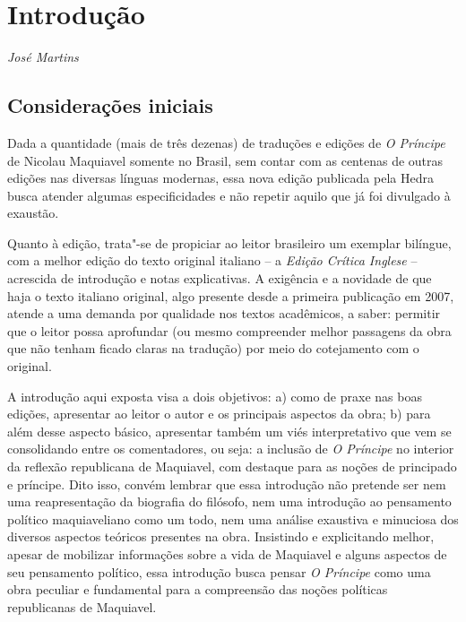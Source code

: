\chapter*{Introdução} %

\begin{flushright}
\emph{José Martins}
\end{flushright}

\section{Considerações iniciais}

Dada a quantidade (mais de três dezenas) de traduções e edições de
\emph{O Príncipe} de Nicolau Maquiavel somente no Brasil, sem contar com
as centenas de outras edições nas diversas línguas modernas, essa nova
edição publicada pela Hedra busca atender algumas especificidades e não
repetir aquilo que já foi divulgado à exaustão.

Quanto à edição, trata"-se de propiciar ao leitor brasileiro um exemplar
bilíngue, com a melhor edição do texto original italiano -- a
\emph{Edição Crítica Inglese} -- acrescida de introdução e notas
explicativas. A exigência e a novidade de que haja o texto italiano
original, algo presente desde a primeira publicação em 2007, atende a
uma demanda por qualidade nos textos acadêmicos, a saber: permitir que o
leitor possa aprofundar (ou mesmo compreender melhor passagens da obra
que não tenham ficado claras na tradução) por meio do cotejamento com o
original.

A introdução aqui exposta visa a dois objetivos: a) como de praxe nas
boas edições, apresentar ao leitor o autor e os principais aspectos da
obra; b) para além desse aspecto básico, apresentar também um viés
interpretativo que vem se consolidando entre os comentadores, ou seja: a
inclusão de \emph{O Príncipe} no interior da reflexão republicana de
Maquiavel, com destaque para as noções de principado e príncipe. Dito
isso, convém lembrar que essa introdução não pretende ser nem uma
reapresentação da biografia do filósofo, nem uma introdução ao
pensamento político maquiaveliano como um todo, nem uma análise
exaustiva e minuciosa dos diversos aspectos teóricos presentes na obra.
Insistindo e explicitando melhor, apesar de mobilizar informações sobre
a vida de Maquiavel e alguns aspectos de seu pensamento político, essa
introdução busca pensar \emph{O Príncipe} como uma obra peculiar e
fundamental para a compreensão das noções políticas republicanas de
Maquiavel.


